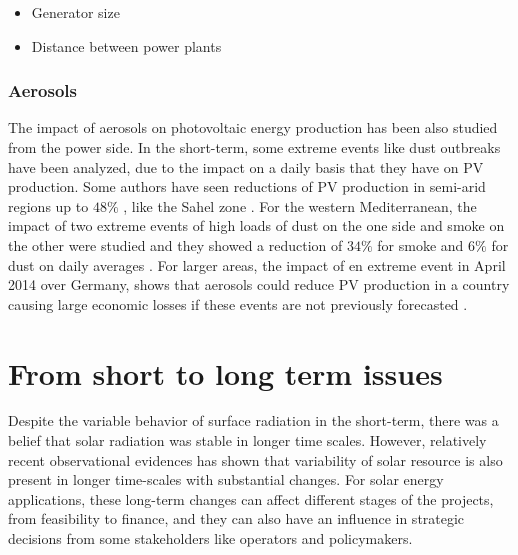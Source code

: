 \begin{itemize}
\item{Generator size}
\item{Distance between power plants}
\end{itemize}

\subsubsection{Aerosols}

The impact of aerosols on photovoltaic energy production has been also studied from the power side. In the short-term, some extreme events like dust outbreaks have been analyzed, due to the impact on a daily basis that they have on PV production. Some authors have seen reductions of PV production in semi-arid regions up to $48\%$ , like the Sahel zone \cite*{Neher2017}. For the western Mediterranean, the impact of two extreme events of high loads of dust on the one side and smoke on the other were studied and they showed a reduction of $34\%$ for smoke and $6\%$ for dust on daily averages \cite*{Gomez-Amo2019}. For larger areas, the impact of en extreme event in April 2014 over Germany, shows that aerosols could reduce PV production in a country causing large economic losses if these events are not previously forecasted \cite*{Rieger2017}.


\section{From short to long term issues}%

Despite the variable behavior of surface radiation in the short-term, there was a belief that solar radiation was stable in longer time scales. However, relatively recent observational evidences has shown that variability of solar resource is also present in longer time-scales with substantial changes. For solar energy applications, these long-term changes can affect different stages of the projects, from feasibility to finance, and they can also have an influence in strategic decisions from some stakeholders like operators and policymakers.

